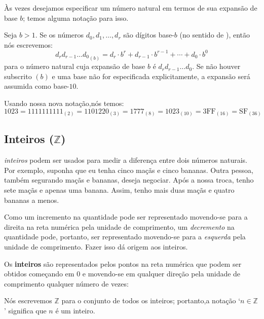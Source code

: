 Às vezes desejamos especificar um número natural em termos de sua expansão de base $b$; temos alguma notação para isso.

\begin{notation}
Seja $b>1$. Se os números $d_0,d_1,\dots,d_r$  são dígitos base-$b$  (no sentido de ), então nós escrevemos:
\[ {d_rd_{r-1} \dots d_0}_{(b)} = d_r \cdot b^r + d_{r-1} \cdot b^{r-1} + \cdots + d_0 \cdot b^0 \]
para o número natural cuja expansão de base $b$ é $d_rd_{r-1} \dots d_0$. Se não houver subscrito $(b)$ e uma base não for especificada explicitamente, a expansão será assumida como base-$10$.
\end{notation}

\begin{example}
Usando nossa nova notação,nós temos:
\[ 1023 = 1111111111_{(2)} = 1101220_{(3)} = 1777_{(8)} = 1023_{(10)} = 3\mathrm{FF}_{(16)} = \mathrm{SF}_{(36)} \]
\end{example}

\subsection*{Inteiros ($\mathbb{Z}$)}

 \textit{inteiros} podem ser usados para medir a diferença entre dois números naturais. Por exemplo, suponha que eu tenha cinco maçãs e cinco bananas. Outra pessoa, também segurando maçãs e bananas, deseja negociar. Após a nossa troca, tenho sete maçãs e apenas uma banana. Assim, tenho mais duas maçãs e quatro bananas a menos.

Como um incremento na quantidade pode ser representado movendo-se para a direita na reta numérica pela unidade de comprimento, um \textit{decremento} na quantidade pode, portanto, ser representado movendo-se para a \textit{esquerda} pela unidade de comprimento. Fazer isso dá origem aos inteiros.

\begin{definition}
\label{defIntegersInformal}
Os \textbf{inteiros} são representados pelos pontos na reta numérica que podem ser obtidos começando em $0$ e movendo-se em qualquer direção pela unidade de comprimento qualquer número de vezes:

\begin{center}
\end{center}
Nós escrevemos  $\mathbb{Z}$  para o conjunto de todos os inteiros; portanto,a notação `$n \in \mathbb{Z}$' significa que $n$ é um inteiro.
\end{definition}

